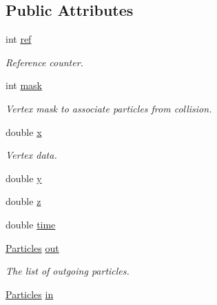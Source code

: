 \subsection*{Public Attributes}
\begin{DoxyCompactItemize}
\item 
int \hyperlink{class_d_d4hep_1_1_simulation_1_1_geant4_vertex_a27572aae6fd5018503860b323bc9d34e}{ref}
\begin{DoxyCompactList}\small\item\em Reference counter. \item\end{DoxyCompactList}\item 
int \hyperlink{class_d_d4hep_1_1_simulation_1_1_geant4_vertex_acd55879e69a2b47c68af29904abb584a}{mask}
\begin{DoxyCompactList}\small\item\em Vertex mask to associate particles from collision. \item\end{DoxyCompactList}\item 
double \hyperlink{class_d_d4hep_1_1_simulation_1_1_geant4_vertex_a0c73b563689113d23c51d5b5864a63f8}{x}
\begin{DoxyCompactList}\small\item\em Vertex data. \item\end{DoxyCompactList}\item 
double \hyperlink{class_d_d4hep_1_1_simulation_1_1_geant4_vertex_afbb9e4460c4c7a1610b5d3d0ccb37e25}{y}
\item 
double \hyperlink{class_d_d4hep_1_1_simulation_1_1_geant4_vertex_af2489a2b21e08b2cc0ffe1f4bf1937df}{z}
\item 
double \hyperlink{class_d_d4hep_1_1_simulation_1_1_geant4_vertex_a3c68aa0fed7db61bf66bfcfb03ad5ca0}{time}
\item 
\hyperlink{class_d_d4hep_1_1_simulation_1_1_geant4_vertex_a7a0331b96dfa8ff9b4a802caa8dd031c}{Particles} \hyperlink{class_d_d4hep_1_1_simulation_1_1_geant4_vertex_a238ee91ad7a5d6230d58335af4af6d70}{out}
\begin{DoxyCompactList}\small\item\em The list of outgoing particles. \item\end{DoxyCompactList}\item 
\hyperlink{class_d_d4hep_1_1_simulation_1_1_geant4_vertex_a7a0331b96dfa8ff9b4a802caa8dd031c}{Particles} \hyperlink{class_d_d4hep_1_1_simulation_1_1_geant4_vertex_acf382e2d22907f72105b2a107e167327}{in}

\end{DoxyCompactItemize}
